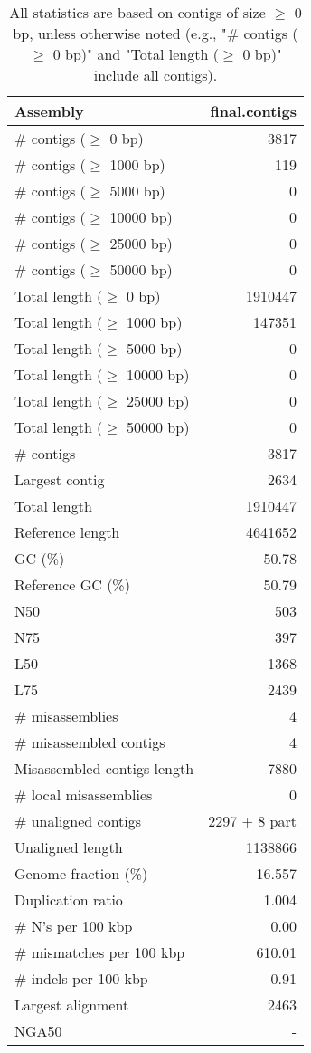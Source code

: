 \documentclass[12pt,a4paper]{article}
\begin{document}
\begin{table}[ht]
\begin{center}
\caption{All statistics are based on contigs of size $\geq$ 0 bp, unless otherwise noted (e.g., "\# contigs ($\geq$ 0 bp)" and "Total length ($\geq$ 0 bp)" include all contigs).}
\begin{tabular}{|l*{1}{|r}|}
\hline
Assembly & final.contigs \\ \hline
\# contigs ($\geq$ 0 bp) & 3817 \\ \hline
\# contigs ($\geq$ 1000 bp) & 119 \\ \hline
\# contigs ($\geq$ 5000 bp) & 0 \\ \hline
\# contigs ($\geq$ 10000 bp) & 0 \\ \hline
\# contigs ($\geq$ 25000 bp) & 0 \\ \hline
\# contigs ($\geq$ 50000 bp) & 0 \\ \hline
Total length ($\geq$ 0 bp) & 1910447 \\ \hline
Total length ($\geq$ 1000 bp) & 147351 \\ \hline
Total length ($\geq$ 5000 bp) & 0 \\ \hline
Total length ($\geq$ 10000 bp) & 0 \\ \hline
Total length ($\geq$ 25000 bp) & 0 \\ \hline
Total length ($\geq$ 50000 bp) & 0 \\ \hline
\# contigs & 3817 \\ \hline
Largest contig & 2634 \\ \hline
Total length & 1910447 \\ \hline
Reference length & 4641652 \\ \hline
GC (\%) & 50.78 \\ \hline
Reference GC (\%) & 50.79 \\ \hline
N50 & 503 \\ \hline
N75 & 397 \\ \hline
L50 & 1368 \\ \hline
L75 & 2439 \\ \hline
\# misassemblies & 4 \\ \hline
\# misassembled contigs & 4 \\ \hline
Misassembled contigs length & 7880 \\ \hline
\# local misassemblies & 0 \\ \hline
\# unaligned contigs & 2297 + 8 part \\ \hline
Unaligned length & 1138866 \\ \hline
Genome fraction (\%) & 16.557 \\ \hline
Duplication ratio & 1.004 \\ \hline
\# N's per 100 kbp & 0.00 \\ \hline
\# mismatches per 100 kbp & 610.01 \\ \hline
\# indels per 100 kbp & 0.91 \\ \hline
Largest alignment & 2463 \\ \hline
NGA50 & - \\ \hline
\end{tabular}
\end{center}
\end{table}
\end{document}
